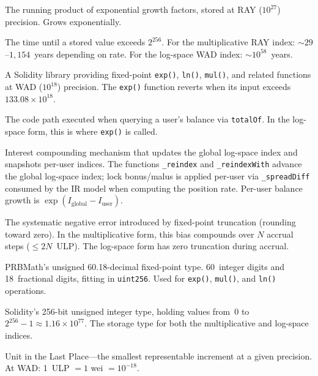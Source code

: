 \documentclass[10pt,a4paper,twocolumn]{article}
\begin{document}
\begin{description}[style=nextline, font=\normalfont\bfseries, leftmargin=1.5em]
\item[Multiplicative Index ($I$)] The running product of exponential growth factors, stored at RAY ($10^{27}$) precision. Grows exponentially.

\item[Overflow Horizon] The time until a stored value exceeds $2^{256}$. For the multiplicative RAY index: ${\sim}29$--$1{,}154$~years depending on rate. For the log-space WAD index: ${\sim}10^{58}$~years.

\item[PRBMath] A Solidity library providing fixed-point \texttt{exp()}, \texttt{ln()}, \texttt{mul()}, and related functions at WAD ($10^{18}$) precision. The \texttt{exp()} function reverts when its input exceeds $133.08 \times 10^{18}$.

\item[Read Path] The code path executed when querying a user's balance via \texttt{totalOf}. In the log-space form, this is where \texttt{exp()} is called.

\item[Reindex] Interest compounding mechanism that updates the global log-space index and snapshots per-user indices. The functions \texttt{\_reindex} and \texttt{\_reindexWith} advance the global log-space index; lock bonus/malus is applied per-user via \texttt{\_spreadDiff} consumed by the IR model when computing the position rate. Per-user balance growth is $\exp(I_{\text{global}} - I_{\text{user}})$.

\item[Truncation Bias] The systematic negative error introduced by fixed-point truncation (rounding toward zero). In the multiplicative form, this bias compounds over $N$ accrual steps ($\leq 2N$~ULP). The log-space form has zero truncation during accrual.

\item[UD60x18] PRBMath's unsigned 60.18-decimal fixed-point type. 60~integer digits and 18~fractional digits, fitting in \texttt{uint256}. Used for \texttt{exp()}, \texttt{mul()}, and \texttt{ln()} operations.

\item[uint256] Solidity's 256-bit unsigned integer type, holding values from~0 to $2^{256} - 1 \approx 1.16 \times 10^{77}$. The storage type for both the multiplicative and log-space indices.

\item[ULP] Unit in the Last Place---the smallest representable increment at a given precision. At WAD: 1~ULP $= 1$ wei $= 10^{-18}$.


\end{description}
\end{document}
